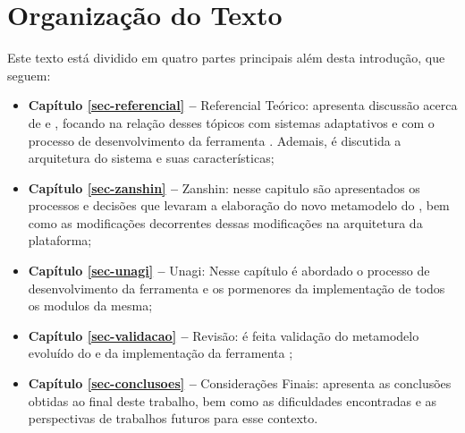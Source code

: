 \section{Organização do Texto}
\label{sec-intro-organizacao}

Este texto está dividido em quatro partes principais além desta introdução, que seguem:

\begin{itemize}
	\item \textbf{Capítulo \ref{sec-referencial} --} Referencial Teórico: apresenta discussão acerca de \gore e \mdd, focando na relação desses tópicos com sistemas adaptativos e com o processo de desenvolvimento da ferramenta \unagi. Ademais, é discutida a arquitetura do sistema \zanshin e suas características;
	
	\item \textbf{Capítulo \ref{sec-zanshin} --} Zanshin: nesse capitulo são apresentados os processos e decisões que levaram a elaboração do novo metamodelo do \zanshin, bem como as modificações decorrentes dessas modificações na arquitetura da plataforma;
	
	\item \textbf{Capítulo \ref{sec-unagi} --} Unagi: Nesse capítulo é abordado o processo de desenvolvimento da ferramenta \unagi e os pormenores da implementação de todos os modulos da mesma;
	
	\item \textbf{Capítulo \ref{sec-validacao} --} Revisão: é feita validação do metamodelo evoluído do \zanshin e da implementação da ferramenta \unagi;
	
	\item \textbf{Capítulo \ref{sec-conclusoes} --} Considerações Finais: apresenta as conclusões obtidas ao final deste trabalho, bem como as dificuldades encontradas e as perspectivas de trabalhos futuros para esse contexto.
\end{itemize}









